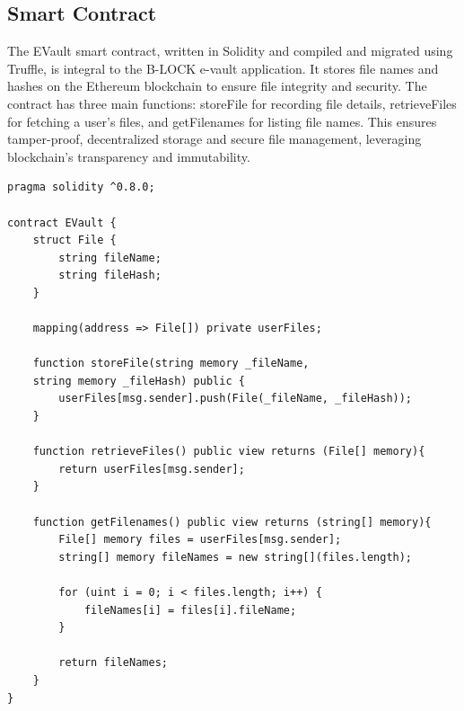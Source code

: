\documentclass[12pt,a4paper]{report}
\begin{document}
\subsection{Smart Contract}
The EVault smart contract\cite{antonopoulos2018mastering}, written in Solidity and compiled and migrated using Truffle\cite{truffledocs}, is integral to the B-LOCK e-vault application. It stores file names and hashes on the Ethereum blockchain to ensure file integrity and security. The contract has three main functions: storeFile for recording file details, retrieveFiles for fetching a user's files, and getFilenames for listing file names. This ensures tamper-proof, decentralized storage and secure file management, leveraging blockchain's transparency and immutability.
\begin{lstlisting}[caption=Solidity Smart Contract (EVault.sol)]
    pragma solidity ^0.8.0;

contract EVault {
    struct File {
        string fileName;
        string fileHash;
    }

    mapping(address => File[]) private userFiles;

    function storeFile(string memory _fileName, 
    string memory _fileHash) public {
        userFiles[msg.sender].push(File(_fileName, _fileHash));
    }

    function retrieveFiles() public view returns (File[] memory){
        return userFiles[msg.sender];
    }
    
    function getFilenames() public view returns (string[] memory){
        File[] memory files = userFiles[msg.sender];
        string[] memory fileNames = new string[](files.length);

        for (uint i = 0; i < files.length; i++) {
            fileNames[i] = files[i].fileName;
        }

        return fileNames;
    }
}
    \end{lstlisting}
\end{document}
